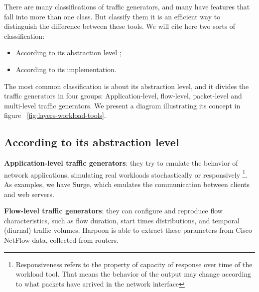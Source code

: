 There are many classifications of traffic generators\cite{sourcesonoff-paper}\cite{hybrid-traffic-gen}\cite{validate-trafficgen}\cite{do-you-trust}, and many have features that fall into more than one class. But classify them it is an efficient way to distinguish the difference between these tools. We will cite here two sorts of classification:

\begin{itemize}
	\item According to its abstraction level \cite{do-you-trust};
	\item According to its implementation.
\end{itemize}

The most common classification is about its abstraction level\cite{do-you-trust}, and it divides the traffic generators in four groups: Application-level, flow-level, packet-level and multi-level traffic generators. We present a diagram illustrating its concept in figure ~\ref{fig:layers-workload-tools}.

\subsection{According to its abstraction level}

\textbf{Application-level traffic generators}: they try to emulate the behavior of network applications, simulating real workloads stochastically or responsively \footnote{Responsiveness refers to the property of capacity of response over time of the workload tool. That means the behavior of the output may change according to what packets have arrived in the network interface}. As examples, we have Surge\cite{surge-paper}, which emulates the communication between clients and web servers.

\textbf{Flow-level traffic generators}: they can configure and reproduce flow characteristics\cite{do-you-trust}\cite{sourcesonoff-paper}, such as flow duration, start times distributions, and temporal (diurnal) traffic volumes\cite{do-you-trust}. Harpoon \cite{harpoon-paper} is able to extract these parameters from Cisco NetFlow data, collected from  routers.

